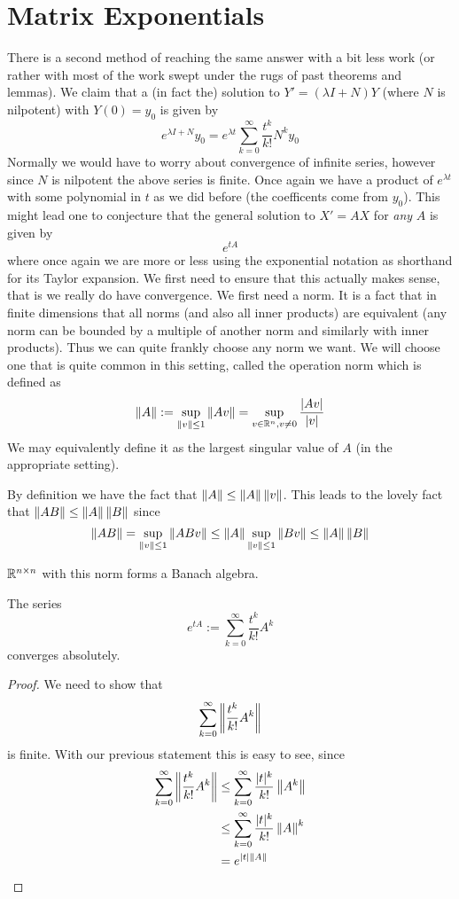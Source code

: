 \section{Matrix Exponentials}
There is a second method of reaching the same answer with a bit less work (or rather with most of the work swept under the rugs of past theorems and lemmas). We claim that a (in fact the) solution to $Y' = (\lambda I + N)Y$ (where $N$ is nilpotent) with $Y(0)=  y_0$ is given by
$$e^{\lambda I  + N}y_0 = e^{\lambda t} \sum_{k = 0}^{\infty} \frac{t^k}{k!} N^k y_0$$
Normally we would have to worry about convergence of infinite series, however since $N$ is nilpotent the above series is finite. Once again we have a product of $e^{\lambda t}$ with some polynomial in $t$ as we did before (the coefficents come from $y_0$). This might lead one to conjecture that the general solution to $X' = AX$ for \textit{any} $A$ is given by
$$e^{tA}$$
where once again we are more or less using the exponential notation as shorthand for its Taylor expansion. We first need to ensure that this actually makes sense, that is we really do have convergence. We first need a norm. It is a fact that in finite dimensions that all norms (and also all inner products) are equivalent (any norm can be bounded by a multiple of another norm and similarly with inner products). Thus we can quite frankly choose any norm we want. We will choose one that is quite common in this setting, called the operation norm which is defined as
$$ \left\lVert A\right\rVert := \sup_{\left\lVert v\right\rVert \leq 1} \left\lVert Av\right\rVert = \sup_{v \in \mathbb{R}^n, v\neq 0} \frac{|Av|}{|v|} $$
We may equivalently define it as the largest singular value of $A$ (in the appropriate setting).

By definition we have the fact that $\left\lVert A\right\rVert \leq \left\lVert A\right\rVert \left\lVert v\right\rVert$. This leads to the lovely fact that $\left\lVert AB\right\rVert \leq \left\lVert A\right\rVert \left\lVert B\right\rVert$ since
$$ \left\lVert AB\right\rVert = \sup_{\left\lVert v\right\rVert \leq 1} \left\lVert ABv\right\rVert \leq \left\lVert A\right\rVert \sup_{\left\lVert v\right\rVert \leq 1} \left\lVert Bv\right\rVert \leq \left\lVert A\right\rVert \left\lVert B\right\rVert $$
\begin{remark}
$\mathbb{R}^{n \times n}$ with this norm forms a Banach algebra.
\end{remark}

\begin{proposition}
The series
$$ e^{tA} := \sum_{k = 0}^{\infty} \frac{t^k}{k!} A^k $$
converges absolutely.
\end{proposition}
\begin{proof}
We need to show that
$$ \sum_{k = 0}^{\infty} \left\lVert \frac{t^k}{k!} A^k \right\rVert $$
is finite. With our previous statement this is easy to see, since
\begin{align*}
    \sum_{k = 0}^{\infty} \left\lVert \frac{t^k}{k!} A^k \right\rVert &\leq \sum_{k = 0}^{\infty} \frac{|t|^k}{k!} \left\lVert A^k\right\rVert\\
    &\leq \sum_{k = 0}^{\infty} \frac{|t|^k}{k!} \left\lVert A\right\rVert^k\\
    &= e^{|t| \left\lVert A\right\rVert}
\end{align*}
\end{proof}

